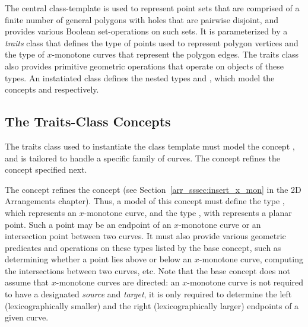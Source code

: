 The central class-template  is used to
represent point sets that are comprised of a finite number of general
polygons with holes that are pairwise disjoint, and provides various Boolean
set-operations on such sets. It is parameterized by a {\em traits}
class that defines the type of points used to represent polygon
vertices and the type of $x$-monotone curves that represent the
polygon edges. The traits class also provides primitive geometric
operations that operate on objects of these types. An instatiated
 class defines the nested types 
 and
, which model
the concepts  and
 respectively.

\subsection{The Traits-Class Concepts\label{bso_ssec:traits_concepts}}

The traits class used to instantiate the 
class template must model the concept ,
and is tailored to handle a specific family of curves. The concept
 refines the concept
 specified next.

The concept  refines the 
concept  (see 
Section~\ref{arr_sssec:insert_x_mon} in the 2D Arrangements chapter).
Thus, a model of this concept must define the type , 
which represents an $x$-monotone curve, and the type , 
with represents a planar point. Such a point may be an endpoint of an
$x$-monotone curve or an intersection point between two curves.
It must also provide various geometric predicates and operations 
on these types listed by the base concept, such as determining whether
a point lies above or below an $x$-monotone curve, computing the
intersections between two curves, etc. Note that the base concept does
not assume that $x$-monotone curves are directed: an $x$-monotone
curve is not required to have a designated {\em source} and {\em
target}, it is only required to determine the left (lexicographically
smaller) and the right (lexicographically larger) endpoints of a given
curve.


